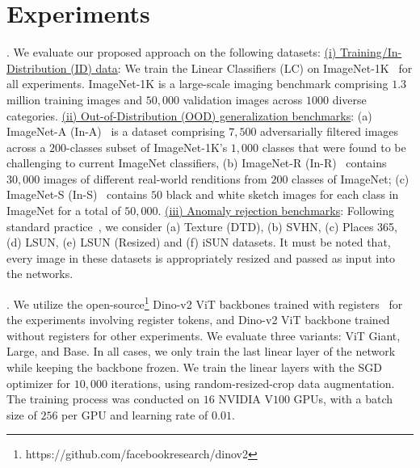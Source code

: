 



\section{Experiments}
. We evaluate our proposed approach on the following datasets: \underline{(i) Training/In-Distribution (ID) data}: We train the Linear Classifiers (LC) on ImageNet-1K~\cite{russakovsky2015imagenet} for all experiments. ImageNet-1K is a large-scale imaging benchmark comprising $1.3$ million training images and $50,000$ validation images across $1000$ diverse categories. \underline{(ii) Out-of-Distribution (OOD) generalization benchmarks}: (a) ImageNet-A (In-A)~\cite{hendrycks2021natural} is a dataset comprising $7,500$ adversarially filtered images across a $200$-classes subset of ImageNet-1K’s $1,000$ classes that were found to be challenging to current ImageNet classifiers, (b) ImageNet-R (In-R)~\cite{hendrycks2021many} contains $30,000$ images of different real-world renditions from $200$ classes of ImageNet; (c) ImageNet-S (In-S)~\cite{wang2019learning} contains $50$ black and white sketch images for each class in ImageNet for a total of $50,000$. \underline{(iii) Anomaly rejection benchmarks}: Following standard practice~\cite{energyood}, we consider (a) Texture (DTD), (b) SVHN, (c) Places 365, (d) LSUN, (e) LSUN (Resized) and (f) iSUN datasets. It must be noted that, every image in these datasets is appropriately resized and passed as input into the networks.  

. We utilize the open-source\footnote{https://github.com/facebookresearch/dinov2} Dino-v2 ViT backbones trained with registers~\cite{darcet2024vision} for the experiments involving register tokens, and Dino-v2 ViT backbone trained without registers for other experiments.  We evaluate three variants: ViT Giant, Large, and Base. In all cases, we only train the last linear layer of the network while keeping the backbone frozen. We train the linear layers with the SGD optimizer for $10,000$ iterations, using random-resized-crop data augmentation. The training process was conducted on $16$ NVIDIA V$100$ GPUs, with a batch size of $256$ per GPU and learning rate of $0.01$.


